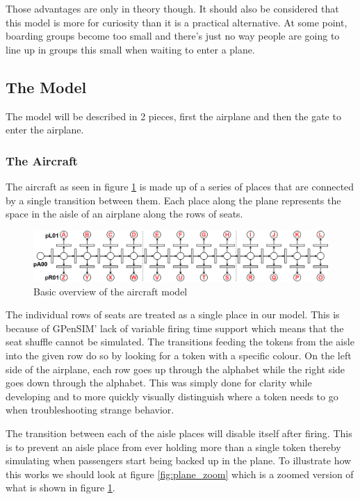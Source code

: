 \documentclass[english]{article}
\begin{document}
Those advantages are only in theory though. It should also be considered that this model is more for curiosity than it is a practical alternative. At some point, boarding groups become too small and there's just no way people are going to line up in groups this small when waiting to enter a plane.


\subsection{The Model}
The model will be described in 2 pieces, first the airplane and then the gate to enter the airplane.

\subsubsection{The Aircraft}
The aircraft as seen in figure \ref{fig:plane} is made up of a series of places that are connected by a single transition between them. Each place along the plane represents the space in the aisle of an airplane along the rows of seats. 

\begin{figure}[H]
    \centering
    \includegraphics[width=\textwidth]{figures/plane.jpg}
    \caption{Basic overview of the aircraft model}
    \label{fig:plane}
\end{figure}

The individual rows of seats are treated as a single place in our model. This is because of GPenSIM' lack of variable firing time support which means that the seat shuffle cannot be simulated. The transitions feeding the tokens from the aisle into the given row do so by looking for a token with a specific colour. On the left side of the airplane, each row goes up through the alphabet while the right side goes down through the alphabet. This was simply done for clarity while developing and to more quickly visually distinguish where a token needs to go when troubleshooting strange behavior. 

The transition between each of the aisle places will disable itself after firing. This is to prevent an aisle place from ever holding more than a single token thereby simulating when passengers start being backed up in the plane. To illustrate how this works we should look at figure \ref{fig:plane_zoom} which is a zoomed version of what is shown in figure \ref{fig:plane}.
\end{document}
